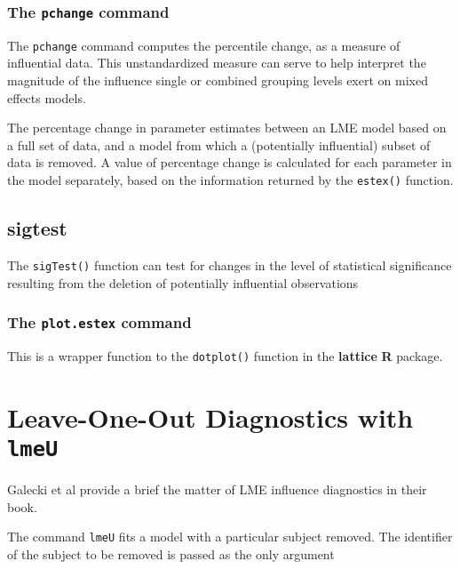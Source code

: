 \documentclass[12pt, a4paper]{article}
\begin{document}



\subsubsection*{The \texttt{pchange} command}

The \texttt{pchange} command computes the percentile change, as a measure of influential data. This unstandardized measure can
serve to help interpret the magnitude of the influence single or combined grouping levels exert on
mixed effects models. 

The percentage change in parameter estimates between an LME model based on a full set of data, and a model from which a (potentially influential)
subset of data is removed. A value of percentage change is calculated for each parameter in the
model separately, based on the information returned by the \texttt{estex()} function.

\subsection*{sigtest}

The \texttt{sigTest()} function can test for changes in the level of statistical significance resulting from
the deletion of potentially influential observations


\subsubsection*{The \texttt{plot.estex} command}
This is a wrapper function to the \texttt{dotplot()} function in the \textbf{lattice} \textbf{R} package.

\newpage

\section{Leave-One-Out Diagnostics with \texttt{lmeU}}
Galecki et al provide a brief the matter of LME influence diagnostics in their book.

The command \texttt{lmeU} fits a model with a particular subject removed. The identifier of the subject to be removed is passed as the only argument
\end{document}
